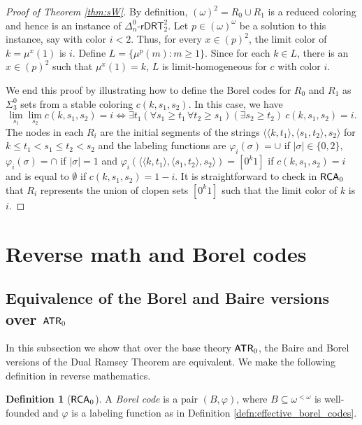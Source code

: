 \documentclass{amsart}
\theoremstyle{definition}
\newtheorem{defn}[thm]{Definition}
\theoremstyle{remark}
\newcommand{\system}[1]{\mbox{\fontfamily{cmss}\fontshape{n}\fontseries{m}%
    \selectfont#1}}
\newcommand{\RCA}{\system{RCA}\ensuremath{_0}}
\newcommand{\ATR}{\system{ATR}\ensuremath{_0}}
\begin{document}
\begin{proof}[Proof of Theorem \ref{thm:sW}]
By definition, $(\omega)^2 = R_0 \cup R_1$ is a reduced coloring and hence is an instance of $\Delta^0_n$-$\mathsf{rDRT}^2_2$. Let $p \in (\omega)^\omega$ be a solution to this 
instance, say with color $i < 2$.  Thus, for every $x \in (p)^2$, the limit color of $k = \mu^x(1)$ is $i$. Define $L = \{\mu^p(m) : m \geq 1\}$. Since for each $k \in L$, there is an 
$x \in (p)^2$ such that $\mu^x(1) = k$, $L$ is limit-homogeneous for $c$ with color $i$.

We end this proof by illustrating how to define the Borel codes for $R_0$ and $R_1$ as $\Sigma^0_3$ sets from a stable coloring $c(k,s_1,s_2)$. In this case, we have 
\[
\lim_{s_1} \lim_{s_2} c(k,s_1,s_2) = i \Leftrightarrow \exists t_1 (\forall s_1 \geq t_1 \, \forall t_2 \geq s_1) (\exists s_2 \geq t_2)~c(k,s_1,s_2) = i.
\]
The nodes in each $R_i$ are the initial segments of the strings $\langle \langle k,t_1 \rangle, \langle s_1,t_2 \rangle, s_2 \rangle$ for $k \leq t_1 < s_1 \leq t_2 < s_2$ and  
the labeling functions are $\varphi_i(\sigma) = \cup$ if $|\sigma| \in \{ 0,2 \}$, $\varphi_i(\sigma) = \cap$ if $|\sigma|=1$ and $\varphi_i(\langle \langle k,t_1 \rangle, \langle s_1,t_2 \rangle, s_2 \rangle) = 
[0^k1]$ if $c(k,s_1,s_2) = i$ and is equal to $\emptyset$ if $c(k,s_1,s_2) = 1-i$. It is straightforward to check in $\RCA$ that $R_i$ represents the union of clopen sets $[0^k1]$ such that 
the limit color of $k$ is $i$. 
\end{proof} 


\section{Reverse math and Borel codes}
\label{sec:codes}

\subsection{Equivalence of the Borel and Baire versions over $\ATR$} 
\label{subsec:Borel_version}
In this subsection we show that over the base theory $\ATR$, the Baire
and Borel versions of the Dual Ramsey Theorem are equivalent.
We make the following definition in reverse mathematics.
\begin{defn}[$\RCA$]\label{defn:borel}
A \emph{Borel code} is a pair
$(B,\varphi)$, where $B \subseteq \omega^{<\omega}$ 
is well-founded and $\varphi$ is a labeling function 
as in Definition \ref{defn:effective_borel_codes}.
\end{defn}
\end{document}
